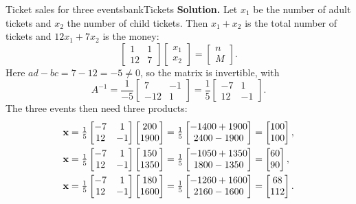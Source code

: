 \documentclass[11pt]{article}
\begin{document}
\begin{exmp}{Ticket sales for three events}{bankTickets}
\textbf{Solution.} Let $x_1$ be the number of adult tickets and $x_2$ the number of child tickets. Then $x_1+x_2$ is the total number of tickets and $12x_1+7x_2$ is the money:
\[
\begin{bmatrix}1&1\\12&7\end{bmatrix}\begin{bmatrix}x_1\\x_2\end{bmatrix}=\begin{bmatrix}n\\M\end{bmatrix}.
\]
Here $ad-bc=7-12=-5\neq0$, so the matrix is invertible, with
\[
A^{-1}=\frac1{-5}\begin{bmatrix}7&-1\\-12&1\end{bmatrix}=\frac15\begin{bmatrix}-7&1\\12&-1\end{bmatrix}.
\]
The three events then need three products:
\begin{align*}
\bv{x}&=\tfrac15\begin{bmatrix}-7&1\\12&-1\end{bmatrix}\begin{bmatrix}200\\1900\end{bmatrix}=\tfrac15\begin{bmatrix}-1400+1900\\2400-1900\end{bmatrix}=\begin{bmatrix}100\\100\end{bmatrix},\\
\bv{x}&=\tfrac15\begin{bmatrix}-7&1\\12&-1\end{bmatrix}\begin{bmatrix}150\\1350\end{bmatrix}=\tfrac15\begin{bmatrix}-1050+1350\\1800-1350\end{bmatrix}=\begin{bmatrix}60\\90\end{bmatrix},\\
\bv{x}&=\tfrac15\begin{bmatrix}-7&1\\12&-1\end{bmatrix}\begin{bmatrix}180\\1600\end{bmatrix}=\tfrac15\begin{bmatrix}-1260+1600\\2160-1600\end{bmatrix}=\begin{bmatrix}68\\112\end{bmatrix}.

\end{align*}
\end{exmp}
\end{document}
